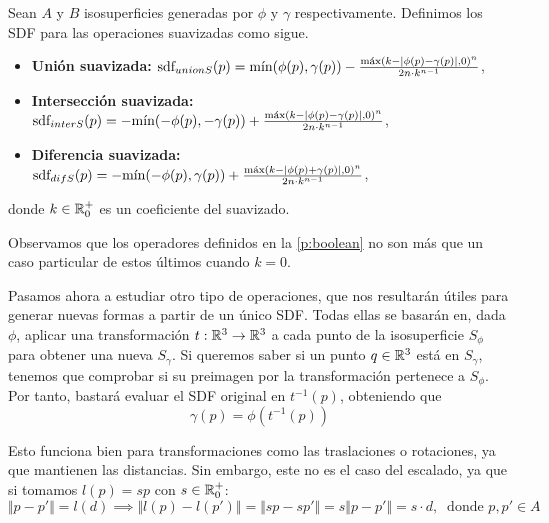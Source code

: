 
\begin{definicion}
    Sean $A$ y $B$ isosuperficies generadas por $\phi$ y $\gamma$ respectivamente. Definimos los SDF para las operaciones suavizadas como sigue.
    \begin{itemize}
        \item \textbf{Unión suavizada: } $\sdf_{unionS}(p) = \Min(\phi(p),\gamma(p)) - \frac{\Max\left( k - |\phi(p) - \gamma(p)|, 0\right)^n}{2n\cdot k^{n-1}}$,
        \item \textbf{Intersección suavizada: } $\sdf_{interS}(p) = -\Min(-\phi(p),-\gamma(p)) + \frac{\Max\left( k - |\phi(p) - \gamma(p)|, 0\right)^n}{2n\cdot k^{n-1}}$,
        \item \textbf{Diferencia suavizada: } $\sdf_{difS}(p) = -\Min(-\phi(p),\gamma(p)) + \frac{\Max\left( k - |\phi(p) + \gamma(p)|, 0\right)^n}{2n\cdot k^{n-1}}$,
    \end{itemize}

    donde $k\in \R^+_0$ es un coeficiente del suavizado.        
\end{definicion}

Observamos que los operadores definidos en la \autoref{p:boolean} no son más que un caso particular de estos últimos cuando $k= 0$.\newline


Pasamos ahora a estudiar otro tipo de operaciones, que nos resultarán útiles para generar nuevas formas a partir de un único SDF. Todas ellas se basarán en, dada $\phi$, aplicar una transformación $t:\R^3\to \R^3$ a cada punto de la isosuperficie $S_{\phi}$ para obtener una nueva $S_{\gamma}$. Si queremos saber si un punto $q\in\R^3$ está en $S_{\gamma}$, tenemos que comprobar si su preimagen por la transformación pertenece a $S_{\phi}$. Por tanto, bastará evaluar el SDF original en $t^{-1}(p)$, obteniendo que
\begin{equation*}
    \gamma(p) = \phi(t^{-1}(p))
\end{equation*}

Esto funciona bien para transformaciones como las traslaciones o rotaciones, ya que mantienen las distancias. Sin embargo, este no es el caso del escalado, ya que si tomamos $l(p) = sp$ con $s\in \R^+_0$:
\begin{equation*}
    \Vert p-p'\Vert = l(d) \implies  \Vert l(p)-l(p')\Vert = \Vert sp-sp'\Vert = s\Vert p-p'\Vert = s\cdot d,\  \text{ donde } p,p' \in A
\end{equation*}

